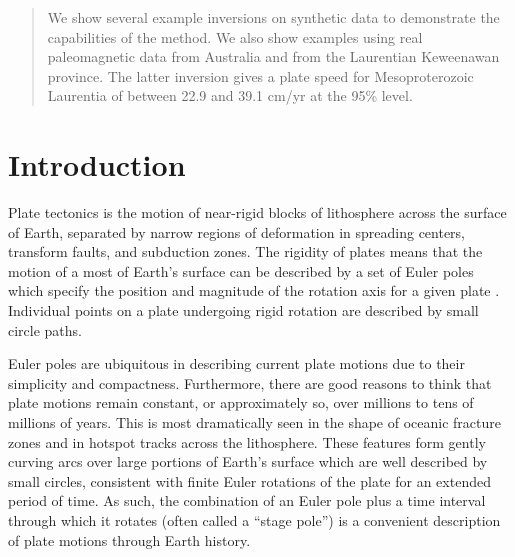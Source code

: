 \documentclass[preprint,12pt,authoryear]{elsarticle}
\begin{document}
\begin{frontmatter}
\begin{abstract}
We show several example inversions on synthetic data to demonstrate the capabilities of the method.
We also show examples using real paleomagnetic data from Australia and 
from the Laurentian Keweenawan province. The latter inversion gives a plate
speed for Mesoproterozoic Laurentia of between 22.9 and 39.1 cm/yr at the 95\% level.
\end{abstract}

\begin{keyword}



\end{keyword}

\end{frontmatter}

\linenumbers

\section{Introduction}
\label{sec:introduction}

Plate tectonics is the motion of near-rigid blocks of lithosphere across the surface of Earth, 
separated by narrow regions of deformation in spreading centers, transform faults, and subduction zones.
The rigidity of plates means that the motion of a most of Earth's surface
can be described by a set of Euler poles which specify the position and magnitude of the rotation axis for a
given plate \citep[cf.][]{cox2009plate}. Individual points on a plate undergoing
rigid rotation are described by small circle paths.

Euler poles are ubiquitous in describing current plate motions 
\citep[e.g.][]{demets1990current, argus2011geologically} due to their simplicity and compactness.
Furthermore, there are good reasons to think that plate motions remain constant, or approximately
so, over millions to tens of millions of years. This is most dramatically seen in the shape
of oceanic fracture zones and in hotspot tracks across the lithosphere. These features
form gently curving arcs over large portions of Earth's surface which are well described by small
circles, consistent with finite Euler rotations of the plate for an extended period of time.
As such, the combination of an Euler pole plus a time interval through which it rotates 
(often called a ``stage pole'') is a convenient description of plate motions through Earth history.
\end{document}
